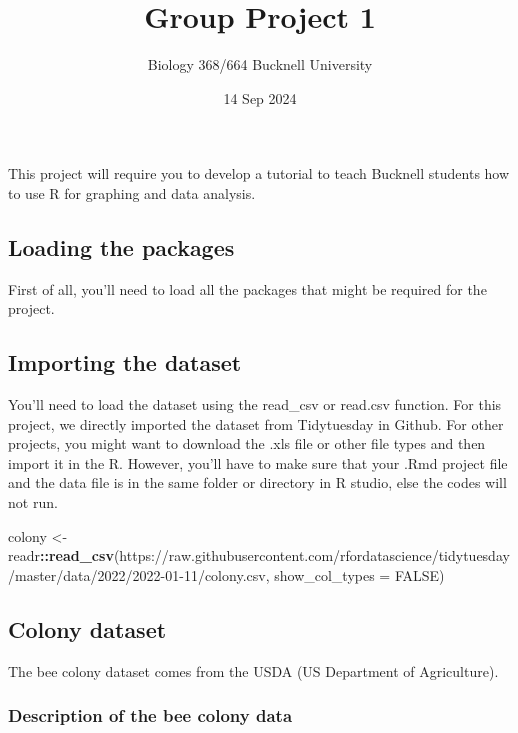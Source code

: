 \documentclass[
]{article}
\title{Group Project 1}
\subtitle{Biology 368/664 Bucknell University}
\author{}
\date{\vspace{-2.5em}14 Sep 2024}
\newenvironment{Shaded}{\begin{snugshade}}{\end{snugshade}}
\newcommand{\AttributeTok}[1]{\textcolor[rgb]{0.13,0.29,0.53}{#1}}
\newcommand{\ConstantTok}[1]{\textcolor[rgb]{0.56,0.35,0.01}{#1}}
\newcommand{\FunctionTok}[1]{\textcolor[rgb]{0.13,0.29,0.53}{\textbf{#1}}}
\newcommand{\NormalTok}[1]{#1}
\newcommand{\OtherTok}[1]{\textcolor[rgb]{0.56,0.35,0.01}{#1}}
\newcommand{\SpecialCharTok}[1]{\textcolor[rgb]{0.81,0.36,0.00}{\textbf{#1}}}
\newcommand{\StringTok}[1]{\textcolor[rgb]{0.31,0.60,0.02}{#1}}
\begin{document}
\maketitle

This project will require you to develop a tutorial to teach Bucknell
students how to use R for graphing and data analysis.

\subsection{Loading the packages}\label{loading-the-packages}

First of all, you'll need to load all the packages that might be
required for the project.

\subsection{Importing the dataset}\label{importing-the-dataset}

You'll need to load the dataset using the read\_csv or read.csv
function. For this project, we directly imported the dataset from
Tidytuesday in Github. For other projects, you might want to download
the .xls file or other file types and then import it in the R. However,
you'll have to make sure that your .Rmd project file and the data file
is in the same folder or directory in R studio, else the codes will not
run.

\begin{Shaded}
\begin{Highlighting}[]
\NormalTok{colony }\OtherTok{\textless{}{-}}\NormalTok{ readr}\SpecialCharTok{::}\FunctionTok{read\_csv}\NormalTok{(}\StringTok{\textquotesingle{}https://raw.githubusercontent.com/rfordatascience/tidytuesday/master/data/2022/2022{-}01{-}11/colony.csv\textquotesingle{}}\NormalTok{, }\AttributeTok{show\_col\_types =} \ConstantTok{FALSE}\NormalTok{)}
\end{Highlighting}
\end{Shaded}

\subsection{Colony dataset}\label{colony-dataset}

The bee colony dataset comes from the USDA (US Department of
Agriculture).

\subsubsection{Description of the bee colony
data}\label{description-of-the-bee-colony-data}
\end{document}
